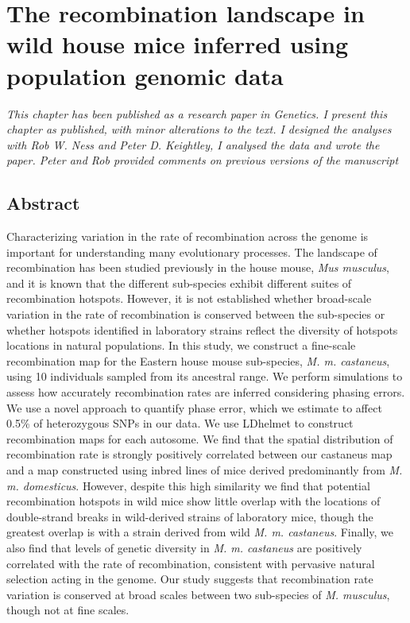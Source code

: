 \chapter{The recombination landscape in wild house mice inferred using population genomic data}

\textit{This chapter has been published as a research paper in Genetics. I present this chapter as published, with minor alterations to the text. I designed the analyses with Rob W. Ness and Peter D. Keightley, I analysed the data and wrote the paper. Peter and Rob provided comments on previous versions of the manuscript}

\section{Abstract}
Characterizing variation in the rate of recombination across the genome is important for understanding many evolutionary processes. The landscape of recombination has been studied previously in the house mouse, \emph{Mus musculus}, and it is known that the different sub-species exhibit different suites of recombination hotspots. However, it is not established whether broad-scale variation in the rate of recombination is conserved between the sub-species or whether hotspots identified in laboratory strains reflect the diversity of hotspots locations in natural populations. In this study, we construct a fine-scale recombination map for the Eastern house mouse sub-species, \emph{M. m. castaneus}, using 10 individuals sampled from its ancestral range. We perform simulations to assess how accurately recombination rates are inferred considering phasing errors. We use a novel approach to quantify phase error, which we estimate to affect 0.5\% of heterozygous SNPs in our data. We use LDhelmet to construct recombination maps for each autosome. We find that the spatial distribution of recombination rate is strongly positively correlated between our castaneus map and a map constructed using inbred lines of mice derived predominantly from \emph{M. m. domesticus}. However, despite this high similarity we find that potential recombination hotspots in wild mice show little overlap with the locations of double-strand breaks in wild-derived strains of laboratory mice, though the greatest overlap is with a strain derived from wild \emph{M. m. castaneus}. Finally, we also find that levels of genetic diversity in \emph{M. m. castaneus} are positively correlated with the rate of recombination, consistent with pervasive natural selection acting in the genome. Our study suggests that recombination rate variation is conserved at broad scales between two sub-species of \emph{M. musculus}, though not at fine scales.


